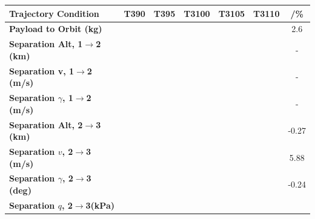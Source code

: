 \begin{table}[ht]
	\centering
	\begin{tabular}{l c c c c c c} 
		\hline \textbf{Trajectory Condition}
		&T390
		&T395
		&T3100
		&T3105
		&T3110
		& /\%
		\\
		\hline \textbf{Payload to Orbit (kg)}
		& \PayloadToOrbitTThreeNinety
		& \PayloadToOrbitTThreeNinetyFive
		& \PayloadToOrbitTThreeStandard
		& \PayloadToOrbitTThreeOneHundredFive
		& \PayloadToOrbitTThreeOneHundredTen
		&2.6
		\\
		\textbf{Separation Alt, 1$\rightarrow$2 (km)}
		& \firstsecondSeparationAltTThreeNinety
		& \firstsecondSeparationAltTThreeNinetyFive
		& \firstsecondSeparationAltTThreeStandard
		& \firstsecondSeparationAltTThreeOneHundredFive
		& \firstsecondSeparationAltTThreeOneHundredTen
		& -
		\\
		\textbf{Separation v, 1$\rightarrow$2 (m/s)}
		& \firstsecondSeparationvTThreeNinety
		& \firstsecondSeparationvTThreeNinetyFive
		& \firstsecondSeparationvTThreeStandard
		& \firstsecondSeparationvTThreeOneHundredFive
		& \firstsecondSeparationvTThreeOneHundredTen
		& -
		\\
		\textbf{Separation $\gamma$, 1$\rightarrow$2 (m/s)}
		& \firstsecondSeparationgammaTThreeNinety
		& \firstsecondSeparationgammaTThreeNinetyFive
		& \firstsecondSeparationgammaTThreeStandard
		& \firstsecondSeparationgammaTThreeOneHundredFive
		& \firstsecondSeparationgammaTThreeOneHundredTen
		& -
		\\
		\textbf{Separation Alt, 2$\rightarrow$3 (km)}
		& \secondthirdSeparationAltTThreeNinety
		& \secondthirdSeparationAltTThreeNinetyFive
		& \secondthirdSeparationAltTThreeStandard
		& \secondthirdSeparationAltTThreeOneHundredFive
		& \secondthirdSeparationAltTThreeOneHundredTen
		&-0.27
		\\
		\textbf{Separation $v$, 2$\rightarrow$3 (m/s)}
		& \secondthirdSeparationvTThreeNinety
		& \secondthirdSeparationvTThreeNinetyFive
		& \secondthirdSeparationvTThreeStandard
		& \secondthirdSeparationvTThreeOneHundredFive
		& \secondthirdSeparationvTThreeOneHundredTen
		&5.88
		\\
		\textbf{Separation $\gamma$, 2$\rightarrow$3 (deg)}
		& \secondthirdSeparationgammaTThreeNinety
		& \secondthirdSeparationgammaTThreeNinetyFive
		& \secondthirdSeparationgammaTThreeStandard
		& \secondthirdSeparationgammaTThreeOneHundredFive
		& \secondthirdSeparationgammaTThreeOneHundredTen
		&-0.24
		\\
		\textbf{Separation $q$, 2$\rightarrow$3(kPa)}
		& \secondthirdSeparationqTThreeNinety

\end{tabular}
\end{table}
